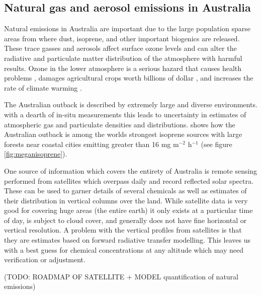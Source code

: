 \subsection{Natural gas and aerosol emissions in Australia}
Natural emissions in Australia are important due to the large population sparse areas from where dust, isoprene, and other important biogenics are released.
These trace gasses and aerosols affect surface ozone levels and can alter the radiative and particulate matter distribution of the atmosphere with harmful results.
Ozone in the lower atmosphere is a serious hazard that causes health problems \cite{Hsieh_2013}, damages agricultural crops worth billions of dollar \cite{Avnery_2011}, and increases the rate of climate warming \cite{IPCC_2013_chap8}. 

The Australian outback is described by extremely large and diverse environments. 
with a dearth of in-situ measurements this leads to uncertainty in estimates of atmospheric gas and particulate densities and distributions.
\citet{Guenther_2006} shows how the Australian outback is among the worlds strongest isoprene sources with large forests near coastal cities emitting greater than 16 mg m$^{-2}$ h$^{-1}$ (see figure \ref{fig:meganisoprene}).

One source of information which covers the entirety of Australia is remote sensing performed from satellites which overpass daily and record reflected solar spectra.
These can be used to garner details of several chemicals as well as estimates of their distribution in vertical columns over the land.
While satellite data is very good for covering huge areas (the entire earth) it only exists at a particular time of day, is subject to cloud cover, and generally does not have fine horizontal or vertical resolution.
A problem with the vertical profiles from satellites is that they are estimates based on forward radiative transfer modelling.
This leaves us with a best guess for chemical concentrations at any altitude which may need verification or adjustment.


(TODO: ROADMAP OF SATELLITE + MODEL quantification of natural emissions)



  
  
  